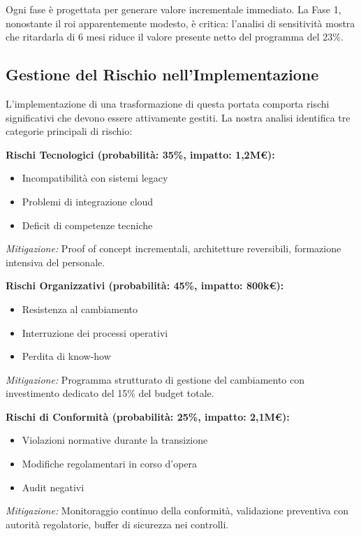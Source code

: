 Ogni fase è progettata per generare valore incrementale immediato. La Fase 1, nonostante il \gls{roi} apparentemente modesto, è critica: l'analisi di sensitività mostra che ritardarla di 6 mesi riduce il valore presente netto del programma del 23\%.

\subsection{\texorpdfstring{Gestione del Rischio nell'Implementazione}{5.4.2 - Gestione del Rischio nell'Implementazione}}
\label{subsec:5.4.2}

L'implementazione di una trasformazione di questa portata comporta rischi significativi che devono essere attivamente gestiti. La nostra analisi identifica tre categorie principali di rischio:

\textbf{Rischi Tecnologici (probabilità: 35\%, impatto: 1,2M€):}
\begin{itemize}
\item Incompatibilità con sistemi legacy
\item Problemi di integrazione cloud
\item Deficit di competenze tecniche
\end{itemize}

\textit{Mitigazione:} Proof of concept incrementali, architetture reversibili, formazione intensiva del personale.

\textbf{Rischi Organizzativi (probabilità: 45\%, impatto: 800k€):}
\begin{itemize}
\item Resistenza al cambiamento
\item Interruzione dei processi operativi
\item Perdita di know-how
\end{itemize}

\textit{Mitigazione:} Programma strutturato di gestione del cambiamento con investimento dedicato del 15\% del budget totale.

\textbf{Rischi di Conformità (probabilità: 25\%, impatto: 2,1M€):}
\begin{itemize}
\item Violazioni normative durante la transizione
\item Modifiche regolamentari in corso d'opera
\item Audit negativi
\end{itemize}

\textit{Mitigazione:} Monitoraggio continuo della conformità, validazione preventiva con autorità regolatorie, buffer di sicurezza nei controlli.


